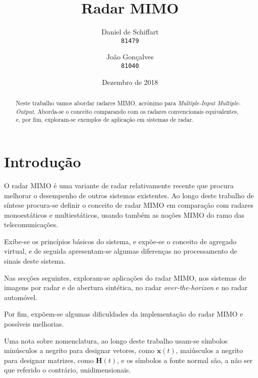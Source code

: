 \documentclass[purist,portuguese]{ist-report}
\author{Daniel de Schiffart \\ \texttt{81479} \and João Gonçalves \\ \texttt{81040}}
\title{Radar MIMO}
\subtitle{}
\date{Dezembro de 2018}
\begin{document}
\makecover


{ \tableofcontents}

\newpage

\begin{abstract}
  Neste trabalho vamos abordar radares MIMO, acrónimo para \textit{Multiple-Input Multiple-Output}. Aborda-se o conceito comparando com os radares convencionais equivalentes, e, por fim, exploram-se exemplos de aplicação em sistemas de radar.
\end{abstract}

\section{Introdução}



O radar MIMO é uma variante de radar relativamente recente que procura melhorar o desempenho de outros sistemas existentes.
Ao longo deste trabalho de síntese procura-se definir o conceito de radar MIMO em comparação com radares monoestáticos e multiestáticos, usando também as noções MIMO do ramo das telecomunicações.

Exibe-se os princípios básicos do sistema, e expõe-se o conceito de agregado virtual, e de seguida apresentam-se algumas diferenças no processamento de sinais deste sistema.

Nas secções seguintes, exploram-se aplicações do radar MIMO, nos sistemas de imagens por radar e de abertura sintética, no radar \textit{over-the-horizon} e no radar automóvel.

Por fim, expõem-se algumas dificuldades da implementação do radar MIMO e possíveis melhorias.

Uma nota sobre nomenclatura, ao longo deste trabalho usam-se símbolos minúsculos a negrito para designar vetores, como $\mathbf{x}(t)$, maiúsculos a negrito para designar matrizes, como $\mathbf{H}(t)$, e os símbolos a fonte normal são, a não ser que referido o contrário, unidimensionais.
\end{document}
